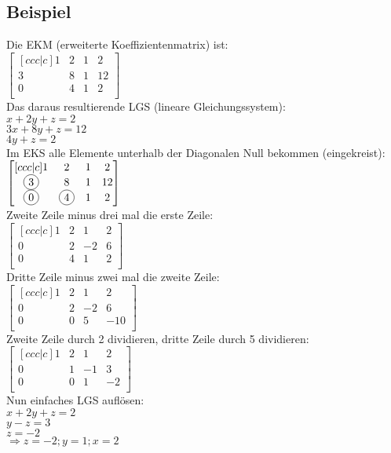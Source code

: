 \documentclass[../main.tex]{subfiles}
\begin{document}
\subsection{Beispiel}
Die EKM (erweiterte Koeffizientenmatrix) ist: \\

$\begin{bmatrix}[ccc|c]
    1 & 2 & 1& 2  \\
    3 & 8 & 1 & 12 \\
    0 & 4 & 1 & 2 \\
\end{bmatrix}$ 
\\ [7pt]
Das daraus resultierende LGS (lineare Gleichungssystem): \\
$x + 2y + z = 2$ \\
$3x + 8y + z = 12$ \\
$ 4y + z = 2$
\\ [7pt]
Im EKS alle Elemente unterhalb der Diagonalen Null bekommen (eingekreist): \\ [7pt]
$\begin{bmatrix}[ccc|c]
    1 & 2 & 1& 2  \\
    \circled{3} & 8 & 1 & 12 \\
    \circled{0} & \circled{4} & 1 & 2 \\
\end{bmatrix}$ 
\\ [7pt]
Zweite Zeile minus drei mal die erste Zeile: \\ [7pt]
$\begin{bmatrix}[ccc|c]
    1 & 2 & 1& 2  \\
    0 & 2 & -2 & 6 \\
    0 & 4 & 1 & 2 \\
\end{bmatrix}$ 
\\ [7pt]
Dritte Zeile minus zwei mal die zweite Zeile: \\ [7pt]
$\begin{bmatrix}[ccc|c]
    1 & 2 & 1& 2  \\
    0 & 2 & -2 & 6 \\
    0 & 0 & 5 & -10 \\
\end{bmatrix}$ 
\\ [7pt]
Zweite Zeile durch 2 dividieren, dritte Zeile durch 5 dividieren: \\ [7pt]
$\begin{bmatrix}[ccc|c]
    1 & 2 & 1& 2  \\
    0 & 1 & -1 & 3 \\
    0 & 0 & 1 & -2 \\
\end{bmatrix}$ 
\\ [7pt]
Nun einfaches LGS auflösen: \\ [7pt]
$x+2y+z=2$ \\
$y-z=3$ \\
$z=-2$ \\
$\Rightarrow z=-2; y=1; x=2$
\end{document}
